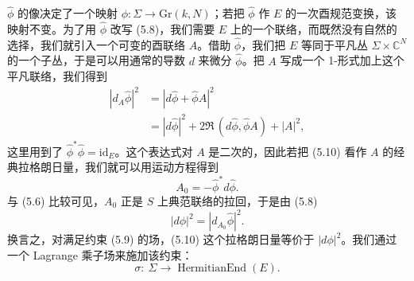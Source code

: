 $\hat\phi$ 的像决定了一个映射 $\phi:\Sigma\to\mathrm{Gr}(k,N)$；若把 $\hat\phi$ 作 $E$ 的一次酉规范变换，该映射不变。为了用 $\hat\phi$ 改写 (5.8)，我们需要 $E$ 上的一个联络，而既然没有自然的选择，我们就引入一个可变的酉联络 $A$。借助 $\hat\phi$，我们把 $E$ 等同于平凡丛 $\Sigma\times\mathbb{C}^N$ 的一个子丛，于是可以用通常的导数 $d$ 来微分 $\hat\phi$。把 $A$ 写成一个 1-形式加上这个平凡联络，我们得到
\begin{equation}
  \tag{5.10}
  \label{eq:5-10}
  \begin{aligned}
    |d_A\hat\phi|^2&=|d\hat\phi+\hat\phi A|^2\\
    &=|d\hat\phi|^2+2\Re\,(d\hat\phi,\hat\phi A)+|A|^2,
  \end{aligned}
\end{equation}
这里用到了 $\hat\phi^*\hat\phi=\mathrm{id}_E$。这个表达式对 $A$ 是二次的，因此若把 (5.10) 看作 $A$ 的经典拉格朗日量，我们就可以用运动方程得到
\begin{equation}
  \tag{5.11}
  \label{eq:5-11}
  A_0=-\hat\phi^*d\hat\phi .
\end{equation}
与 (5.6) 比较可见，$A_0$ 正是 $S$ 上典范联络的拉回，于是由 (5.8)
\[
  |d\phi|^2=|d_{A_0}\hat\phi|^2 .
\]
换言之，对满足约束 (5.9) 的场，(5.10) 这个拉格朗日量等价于 $|d\phi|^2$。我们通过一个 Lagrange 乘子场来施加该约束：
\[
  \sigma:\ \Sigma\longrightarrow\operatorname{HermitianEnd}(E).
\]



